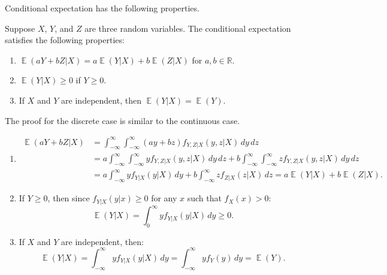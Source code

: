 \documentclass{huhtakm-template-book-v2}
\DeclareMathOperator{\E}{\mathbb{E}}
\begin{document}
    Conditional expectation has the following properties.
    \begin{lem}
        \label{Chapter 1 (Lemma) Properties of conditional expectation}
        Suppose $X$, $Y$, and $Z$ are three random variables. The conditional expectation satisfies the following properties:
        \begin{enumerate}
            \item $\E(aY + bZ | X) = a\E(Y | X) + b\E(Z | X)$ for $a, b \in \mathbb{R}$.
            \item $\E(Y | X) \geq 0$ if $Y \geq 0$.
            \item If $X$ and $Y$ are independent, then $\E(Y | X) = \E(Y)$.
        \end{enumerate}
    \end{lem}
    \begin{proofing}
        The proof for the discrete case is similar to the continuous case.
        \begin{enumerate}
            \item 
            \begin{align*}
                \E(aY + bZ | X) &= \int_{-\infty}^{\infty} \int_{-\infty}^{\infty} (ay + bz) f_{Y,Z|X}(y, z | X) \, dy \, dz \\
                &= a \int_{-\infty}^{\infty} \int_{-\infty}^{\infty} y f_{Y,Z|X}(y, z | X) \, dy \, dz + b \int_{-\infty}^{\infty} \int_{-\infty}^{\infty} z f_{Y,Z|X}(y, z | X) \, dy \, dz \\
                &= a \int_{-\infty}^{\infty} y f_{Y|X}(y | X) \, dy + b \int_{-\infty}^{\infty} z f_{Z|X}(z | X) \, dz = a\E(Y | X) + b\E(Z | X).
            \end{align*}
            \item If $Y \geq 0$, then since $f_{Y|X}(y | x) \geq 0$ for any $x$ such that $f_{X}(x) > 0$:
            \begin{equation*}
                \E(Y | X) = \int_{0}^{\infty} y f_{Y|X}(y | X) \, dy \geq 0.
            \end{equation*} 
            \item If $X$ and $Y$ are independent, then:
            \begin{equation*}
                \E(Y | X) = \int_{-\infty}^{\infty} y f_{Y|X}(y | X) \, dy = \int_{-\infty}^{\infty} y f_{Y}(y) \, dy = \E(Y).
            \end{equation*}
        \end{enumerate}
    \end{proofing}
\end{document}
